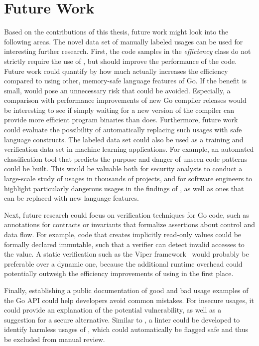 
\chapter{Future Work}\label{ch:future-work}

Based on the contributions of this thesis, future work might look into the following areas.
The novel data set of manually labeled \unsafe{} usages can be used for interesting further research.
First, the code samples in the \textit{efficiency} class do not strictly require the use of \unsafe{}, but should
improve the performance of the code.
Future work could quantify by how much \unsafe{} actually increases the efficiency compared to using other, memory-safe
language features of Go.
If the benefit is small, \unsafe{} would pose an unnecessary risk that could be avoided.
Especially, a comparison with performance improvements of new Go compiler releases would be interesting to see if
simply waiting for a new version of the compiler can provide more efficient program binaries than \unsafe{} does.
Furthermore, future work could evaluate the possibility of automatically replacing such \unsafe{} usages with safe
language constructs.
The labeled data set could also be used as a training and verification data set in machine learning applications.
For example, an automated classification tool that predicts the purpose and danger of unseen \unsafe{} code patterns
could be built.
This would be valuable both for security analysts to conduct a large-scale study of \unsafe{} usages in thousands of
projects, and for software engineers to highlight particularly dangerous usages in the findings of \toolGeiger{}, as
well as ones that can be replaced with new language features.

Next, future research could focus on verification techniques for \unsafe{} Go code, such as annotations for
contracts or invariants that formalize assertions about control and data flow.
For example, \unsafe{} code that creates implicitly read-only values could be formally declared immutable, such that
a verifier can detect invalid accesses to the value.
A static verification such as the Viper framework~\cite{muller2016} would probably be preferable over a dynamic one,
because the additional runtime overhead could potentially outweigh the efficiency improvements of using \unsafe{} in the
first place.

Finally, establishing a public documentation of good and bad usage examples of the Go \unsafe{} \acrshort{API} could
help developers avoid common mistakes.
For insecure usages, it could provide an explanation of the potential vulnerability, as well as a suggestion for a
secure alternative.
Similar to \toolSafer{}, a linter could be developed to identify harmless usages of \unsafe{}, which could automatically
be flagged safe and thus be excluded from manual review.

